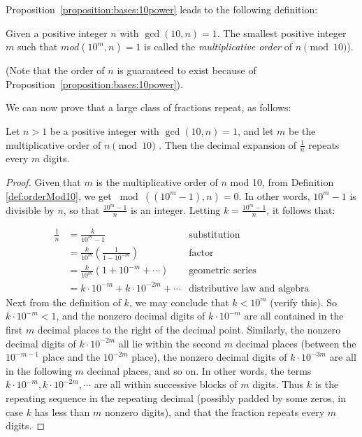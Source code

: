 Proposition~\ref{proposition:bases:10power} leads to the following definition:

\begin{defn}\label{def:orderMod10}
Given a positive integer $n$ with $\gcd(10,n)=1$. The smallest positive integer $m$ such that $mod(10^{m},n)=1$  is called the \textit{multiplicative order} of $n \pmod{10}$).\\
\noindent

(Note that the order of $n$ is guaranteed to exist because of Proposition~\ref{proposition:bases:10power}).
\end{defn}
\noindent

We can now prove that a large class of fractions  repeat, as follows:

\begin{prop}\label{proposition:bases:gcd1}
Let $n>1$ be a positive integer with $\gcd(10,n)=1$, and let $m$ be the multiplicative order of $n \pmod{10}$ . Then the decimal expansion of $\frac{1}{n}$ repeats every $m$ digits.
\end{prop}

\begin{proof}
Given that $m$ is the multiplicative order of $n$ mod 10, from Definition \ref{def:orderMod10}, we get $\bmod((10^{m}-1),n)=0$. In other words, $10^{m}-1$ is divisible by $n$, so that $\frac{10^{m}-1}{n}$ is an integer. Letting $k=\frac{10^{m}-1}{n}$,  it follows that:

\begin{align*}
\frac{1}{n}&=\frac{k}{10^{m}-1} & \text{substitution}\\
&=\frac{k}{10^{m}}\left(\frac{1}{1-10^{-m}}\right) & \text{factor}\\
&=\frac{k}{10^{m}}\left(1+10^{-m}+\cdots\right) &\text{geometric series}\\
&=k \cdot 10^{-m}+ k \cdot 10^{-2m}+\cdots  &\text{distributive law and algebra}
\end{align*}
Next from the definition of $k$, we may conclude that $k < 10^m$ (verify this). So $k\cdot 10^{-m}<1$, and  the nonzero decimal digits of $k\cdot 10^{-m}$ are all contained in the first $m$ decimal places to the right of the decimal point. Similarly, the nonzero decimal digits of $k\cdot 10^{-2m}$ all lie within the second $m$ decimal places (between the $10^{-m-1}$ place and the $10^{-2m}$ place), the  nonzero decimal digits of $k\cdot 10^{-3m}$ are all in the following $m$ decimal places, and so on. In other words,  the terms $k \cdot 10^{-m},  k \cdot 10^{-2m}, \cdots$ are all within successive blocks of $m$  digits.
Thus  $k$ is the repeating sequence in the repeating decimal (possibly padded by some zeros, in case $k$ has less than $m$ nonzero digits), and that the fraction repeats every $m$ digits.
\end{proof}

